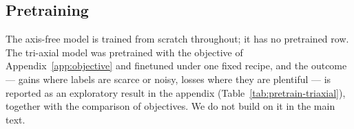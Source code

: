 \begin{table}[t]
\centering
\small
\caption{CroFreMo's tokenizer in place of the host's own, hosts trained
from scratch. Native rows are three-seed means except REVE from scratch
(single seed); transplants are single seeds. Cohen's $\kappa$; CHB-MIT
AUC-PR.}
\label{tab:hosts}
\end{table}

\subsection{Pretraining}
\label{sec:pretrain-results}

The axis-free model is trained from scratch throughout; it has no
pretrained row. The tri-axial model was pretrained with the objective of
Appendix~\ref{app:objective} and finetuned under one fixed recipe, and the
outcome --- gains where labels are scarce or noisy, losses where they are
plentiful --- is reported as an exploratory result in the appendix
(Table~\ref{tab:pretrain-triaxial}), together with the comparison of
objectives. We do not build on it in the main text.
